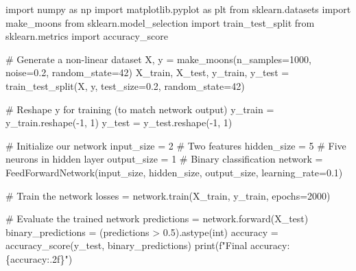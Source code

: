 \documentclass[
  letterpaper,
  DIV=11,
  numbers=noendperiod]{scrreprt}
\newenvironment{Shaded}{\begin{snugshade}}{\end{snugshade}}
\newcommand{\BuiltInTok}[1]{\textcolor[rgb]{0.00,0.23,0.31}{#1}}
\newcommand{\CommentTok}[1]{\textcolor[rgb]{0.37,0.37,0.37}{#1}}
\newcommand{\DecValTok}[1]{\textcolor[rgb]{0.68,0.00,0.00}{#1}}
\newcommand{\FloatTok}[1]{\textcolor[rgb]{0.68,0.00,0.00}{#1}}
\newcommand{\ImportTok}[1]{\textcolor[rgb]{0.00,0.46,0.62}{#1}}
\newcommand{\NormalTok}[1]{\textcolor[rgb]{0.00,0.23,0.31}{#1}}
\newcommand{\OperatorTok}[1]{\textcolor[rgb]{0.37,0.37,0.37}{#1}}
\newcommand{\SpecialCharTok}[1]{\textcolor[rgb]{0.37,0.37,0.37}{#1}}
\newcommand{\SpecialStringTok}[1]{\textcolor[rgb]{0.13,0.47,0.30}{#1}}
\begin{document}
\begin{Shaded}
\begin{Highlighting}[]
\ImportTok{import}\NormalTok{ numpy }\ImportTok{as}\NormalTok{ np}
\ImportTok{import}\NormalTok{ matplotlib.pyplot }\ImportTok{as}\NormalTok{ plt}
\ImportTok{from}\NormalTok{ sklearn.datasets }\ImportTok{import}\NormalTok{ make\_moons}
\ImportTok{from}\NormalTok{ sklearn.model\_selection }\ImportTok{import}\NormalTok{ train\_test\_split}
\ImportTok{from}\NormalTok{ sklearn.metrics }\ImportTok{import}\NormalTok{ accuracy\_score}

\CommentTok{\# Generate a non{-}linear dataset}
\NormalTok{X, y }\OperatorTok{=}\NormalTok{ make\_moons(n\_samples}\OperatorTok{=}\DecValTok{1000}\NormalTok{, noise}\OperatorTok{=}\FloatTok{0.2}\NormalTok{, random\_state}\OperatorTok{=}\DecValTok{42}\NormalTok{)}
\NormalTok{X\_train, X\_test, y\_train, y\_test }\OperatorTok{=}\NormalTok{ train\_test\_split(X, y, test\_size}\OperatorTok{=}\FloatTok{0.2}\NormalTok{, random\_state}\OperatorTok{=}\DecValTok{42}\NormalTok{)}

\CommentTok{\# Reshape y for training (to match network output)}
\NormalTok{y\_train }\OperatorTok{=}\NormalTok{ y\_train.reshape(}\OperatorTok{{-}}\DecValTok{1}\NormalTok{, }\DecValTok{1}\NormalTok{)}
\NormalTok{y\_test }\OperatorTok{=}\NormalTok{ y\_test.reshape(}\OperatorTok{{-}}\DecValTok{1}\NormalTok{, }\DecValTok{1}\NormalTok{)}

\CommentTok{\# Initialize our network}
\NormalTok{input\_size }\OperatorTok{=} \DecValTok{2}  \CommentTok{\# Two features}
\NormalTok{hidden\_size }\OperatorTok{=} \DecValTok{5}  \CommentTok{\# Five neurons in hidden layer}
\NormalTok{output\_size }\OperatorTok{=} \DecValTok{1}  \CommentTok{\# Binary classification}
\NormalTok{network }\OperatorTok{=}\NormalTok{ FeedForwardNetwork(input\_size, hidden\_size, output\_size, learning\_rate}\OperatorTok{=}\FloatTok{0.1}\NormalTok{)}

\CommentTok{\# Train the network}
\NormalTok{losses }\OperatorTok{=}\NormalTok{ network.train(X\_train, y\_train, epochs}\OperatorTok{=}\DecValTok{2000}\NormalTok{)}

\CommentTok{\# Evaluate the trained network}
\NormalTok{predictions }\OperatorTok{=}\NormalTok{ network.forward(X\_test)}
\NormalTok{binary\_predictions }\OperatorTok{=}\NormalTok{ (predictions }\OperatorTok{\textgreater{}} \FloatTok{0.5}\NormalTok{).astype(}\BuiltInTok{int}\NormalTok{)}
\NormalTok{accuracy }\OperatorTok{=}\NormalTok{ accuracy\_score(y\_test, binary\_predictions)}
\BuiltInTok{print}\NormalTok{(}\SpecialStringTok{f"Final accuracy: }\SpecialCharTok{\{}\NormalTok{accuracy}\SpecialCharTok{:.2f\}}\SpecialStringTok{"}\NormalTok{)}


\end{Highlighting}
\end{Shaded}
\end{document}
